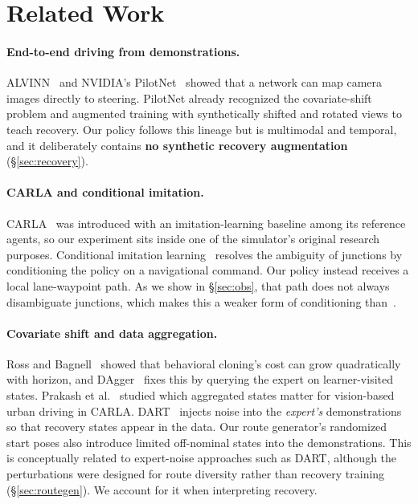 \documentclass[11pt]{article}
\begin{document}
\section{Related Work}

\paragraph{End-to-end driving from demonstrations.} ALVINN~\cite{pomerleau1989alvinn} and NVIDIA's PilotNet~\cite{bojarski2016end} showed that a network can map camera images directly to steering. PilotNet already recognized the covariate-shift problem and augmented training with synthetically shifted and rotated views to teach recovery. Our policy follows this lineage but is multimodal and temporal, and it deliberately contains \textbf{no synthetic recovery augmentation} (\S\ref{sec:recovery}).

\paragraph{CARLA and conditional imitation.} CARLA~\cite{dosovitskiy2017carla} was introduced with an imitation-learning baseline among its reference agents, so our experiment sits inside one of the simulator's original research purposes. Conditional imitation learning~\cite{codevilla2018cil} resolves the ambiguity of junctions by conditioning the policy on a navigational command. Our policy instead receives a local lane-waypoint path. As we show in \S\ref{sec:obs}, that path does not always disambiguate junctions, which makes this a weaker form of conditioning than~\cite{codevilla2018cil}.

\paragraph{Covariate shift and data aggregation.} Ross and Bagnell~\cite{ross2010efficient} showed that behavioral cloning's cost can grow quadratically with horizon, and DAgger~\cite{ross2011dagger} fixes this by querying the expert on learner-visited states. Prakash et al.~\cite{prakash2020exploring} studied which aggregated states matter for vision-based urban driving in CARLA. DART~\cite{laskey2017dart} injects noise into the \emph{expert's} demonstrations so that recovery states appear in the data. Our route generator's randomized start poses also introduce limited off-nominal states into the demonstrations. This is conceptually related to expert-noise approaches such as DART, although the perturbations were designed for route diversity rather than recovery training (\S\ref{sec:routegen}). We account for it when interpreting recovery.
\end{document}
